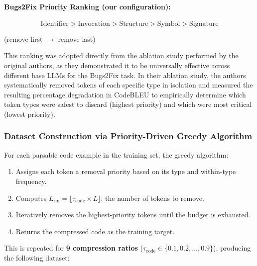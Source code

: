 \documentclass[11pt,a4paper]{article}
\begin{document}
\paragraph{Bugs2Fix Priority Ranking (our configuration):}

\[
\text{Identifier} > \text{Invocation} > \text{Structure} > \text{Symbol} > \text{Signature}
\]

\begin{center}
{\small (remove first $\rightarrow$ remove last)}
\end{center}

This ranking was adopted directly from the ablation study performed by the original authors, as they demonstrated it to be universally effective across different base LLMs for the Bugs2Fix task. In their ablation study, the authors systematically removed tokens of each specific type in isolation and measured the resulting percentage degradation in CodeBLEU to empirically determine which token types were safest to discard (highest priority) and which were most critical (lowest priority).

\subsubsection{Dataset Construction via Priority-Driven Greedy Algorithm}

For each parsable code example in the training set, the greedy algorithm:

\begin{enumerate}[leftmargin=1.5em]
  \item Assigns each token a removal priority based on its type and within-type frequency.
  \item Computes $L_{\text{rm}} = \lfloor\tau_{\text{code}} \times L\rfloor$: the number of tokens to remove.
  \item Iteratively removes the highest-priority tokens until the budget is exhausted.
  \item Returns the compressed code as the training target.
\end{enumerate}

This is repeated for \textbf{9 compression ratios} ($\tau_{\text{code}} \in \{0.1, 0.2, \ldots, 0.9\}$), producing the following dataset:
\end{document}
